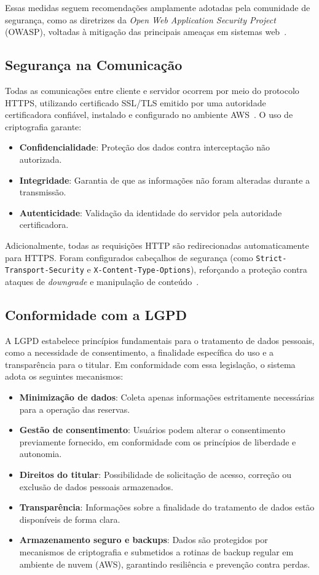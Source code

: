 \documentclass[
	12pt,				%
	openany,			%
	oneside,			%
	a4paper,			%
	english,			%
	french,				%
	spanish,			%
	brazil				%
	]{abntex2}
\begin{document}
Essas medidas seguem recomendações amplamente adotadas pela comunidade de segurança, como as diretrizes da \textit{Open Web Application Security Project} (OWASP), voltadas à mitigação das principais ameaças em sistemas web~\cite{owasp}.

\subsection{Segurança na Comunicação}

Todas as comunicações entre cliente e servidor ocorrem por meio do protocolo HTTPS, utilizando certificado SSL/TLS emitido por uma autoridade certificadora confiável, instalado e configurado no ambiente AWS~\cite{aws-doc}. O uso de criptografia garante:

\begin{itemize}
	\item \textbf{Confidencialidade}: Proteção dos dados contra interceptação não autorizada.
	\item \textbf{Integridade}: Garantia de que as informações não foram alteradas durante a transmissão.
	\item \textbf{Autenticidade}: Validação da identidade do servidor pela autoridade certificadora.
\end{itemize}

Adicionalmente, todas as requisições HTTP são redirecionadas automaticamente para HTTPS. Foram configurados cabeçalhos de segurança (como \texttt{Strict-Transport-Security} e \texttt{X-Content-Type-Options}), reforçando a proteção contra ataques de \textit{downgrade} e manipulação de conteúdo~\cite{rfc-tls}.

\subsection{Conformidade com a LGPD}

A LGPD estabelece princípios fundamentais para o tratamento de dados pessoais, como a necessidade de consentimento, a finalidade específica do uso e a transparência para o titular. Em conformidade com essa legislação, o sistema adota os seguintes mecanismos:

\begin{itemize}
	\item \textbf{Minimização de dados}: Coleta apenas informações estritamente necessárias para a operação das reservas.
	\item \textbf{Gestão de consentimento}: Usuários podem alterar o consentimento previamente fornecido, em conformidade com os princípios de liberdade e autonomia.
	\item \textbf{Direitos do titular}: Possibilidade de solicitação de acesso, correção ou exclusão de dados pessoais armazenados.
	\item \textbf{Transparência}: Informações sobre a finalidade do tratamento de dados estão disponíveis de forma clara.
	\item \textbf{Armazenamento seguro e backups}: Dados são protegidos por mecanismos de criptografia e submetidos a rotinas de backup regular em ambiente de nuvem (AWS), garantindo resiliência e prevenção contra perdas.
\end{itemize}
\end{document}
